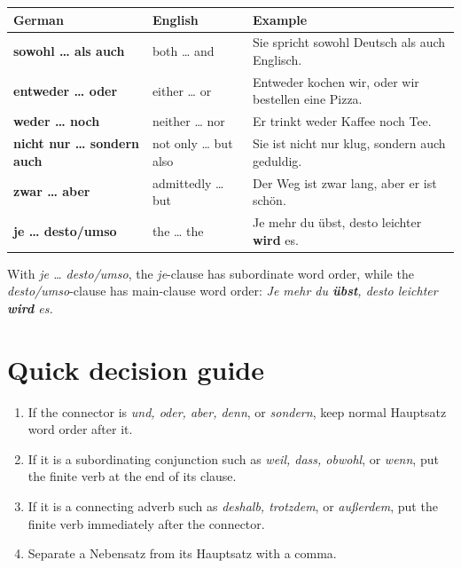 \begin{center}
\small
{}
\begin{tabularx}{\textwidth}{@{}>{\bfseries}l l X@{}}
\toprule
German & English & Example \\
\midrule
sowohl \ldots{} als auch & both \ldots{} and & Sie spricht sowohl Deutsch als auch Englisch. \\
entweder \ldots{} oder & either \ldots{} or & Entweder kochen wir, oder wir bestellen eine Pizza. \\
weder \ldots{} noch & neither \ldots{} nor & Er trinkt weder Kaffee noch Tee. \\
nicht nur \ldots{} sondern auch & not only \ldots{} but also & Sie ist nicht nur klug, sondern auch geduldig. \\
zwar \ldots{} aber & admittedly \ldots{} but & Der Weg ist zwar lang, aber er ist schön. \\
je \ldots{} desto/umso & the \ldots{} the & Je mehr du übst, desto leichter \textbf{wird} es. \\
\bottomrule
\end{tabularx}
\end{center}

With \textit{je \ldots{} desto/umso}, the \textit{je}-clause has subordinate
word order, while the \textit{desto/umso}-clause has main-clause word order:
\textit{Je mehr du \textbf{übst}, desto leichter \textbf{wird} es.}

\section{Quick decision guide}

\begin{enumerate}[leftmargin=*]
  \item If the connector is \textit{und, oder, aber, denn}, or \textit{sondern},
        keep normal Hauptsatz word order after it.
  \item If it is a subordinating conjunction such as \textit{weil, dass,
        obwohl}, or \textit{wenn}, put the finite verb at the end of its clause.
  \item If it is a connecting adverb such as \textit{deshalb, trotzdem}, or
        \textit{außerdem}, put the finite verb immediately after the connector.
  \item Separate a Nebensatz from its Hauptsatz with a comma.
\end{enumerate}
